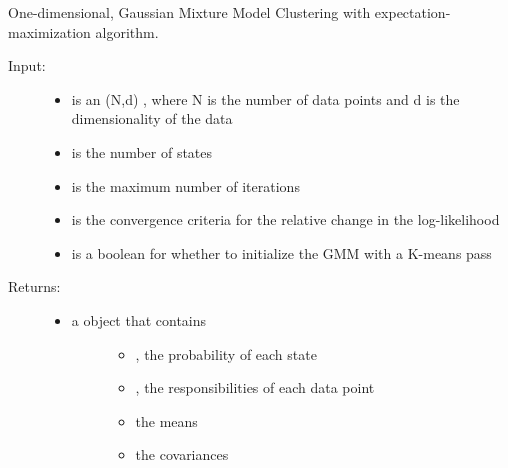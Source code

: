 \documentclass[letterpaper,10pt,english]{sphinxmanual}
\begin{document}
\begin{fulllineitems}
\label{code_utils:utils.clustering.GMM_EM_1D}
One-dimensional, Gaussian Mixture Model Clustering with expectation-maximization algorithm.
\begin{description}
\item[{Input:}] \leavevmode\begin{itemize}
\item {} 
 is an (N,d) , where N is the number of data points and d is the dimensionality of the data

\item {} 
 is the number of states

\item {} 
 is the maximum number of iterations

\item {} 
 is the convergence criteria for the relative change in the log-likelihood

\item {} 
 is a boolean for whether to initialize the GMM with a K-means pass

\end{itemize}

\item[{Returns:}] \leavevmode\begin{itemize}
\item {} \begin{description}
\item[{a  object that contains}] \leavevmode\begin{itemize}
\item {} 
, the probability of each state

\item {} 
, the responsibilities of each data point

\item {} 
 the means

\item {} 
 the covariances

\end{itemize}

\end{description}

\end{itemize}

\end{description}

\end{fulllineitems}
\end{document}
